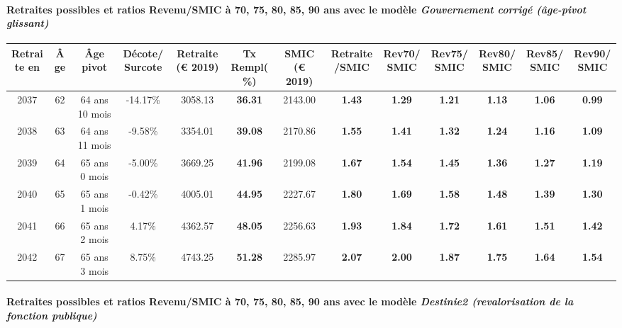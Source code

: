 \paragraph{Retraites possibles et ratios Revenu/SMIC à 70, 75, 80, 85, 90 ans avec le modèle \emph{Gouvernement corrigé (âge-pivot glissant)}}  
 
{ \scriptsize \begin{center} 
\begin{tabular}[htb]{|c|c||c|c||c|c||c||c|c|c|c|c|c|} 
\hline 
 Retraite en &  Âge &  Âge pivot &  Décote/Surcote &  Retraite (\euro{} 2019) &  Tx Rempl(\%) &  SMIC (\euro{} 2019) &  Retraite/SMIC &  Rev70/SMIC &  Rev75/SMIC &  Rev80/SMIC &  Rev85/SMIC &  Rev90/SMIC \\ 
\hline \hline 
 2037 &  62 &  64 ans 10 mois &  -14.17\% &  3058.13 &  {\bf 36.31} &  2143.00 &  {\bf 1.43} &  {\bf 1.29} &  {\bf 1.21} &  {\bf 1.13} &  {\bf 1.06} &  {\bf {\color{red} 0.99}} \\ 
\hline 
 2038 &  63 &  64 ans 11 mois &  -9.58\% &  3354.01 &  {\bf 39.08} &  2170.86 &  {\bf 1.55} &  {\bf 1.41} &  {\bf 1.32} &  {\bf 1.24} &  {\bf 1.16} &  {\bf 1.09} \\ 
\hline 
 2039 &  64 &  65 ans 0 mois &  -5.00\% &  3669.25 &  {\bf 41.96} &  2199.08 &  {\bf 1.67} &  {\bf 1.54} &  {\bf 1.45} &  {\bf 1.36} &  {\bf 1.27} &  {\bf 1.19} \\ 
\hline 
 2040 &  65 &  65 ans 1 mois &  -0.42\% &  4005.01 &  {\bf 44.95} &  2227.67 &  {\bf 1.80} &  {\bf 1.69} &  {\bf 1.58} &  {\bf 1.48} &  {\bf 1.39} &  {\bf 1.30} \\ 
\hline 
 2041 &  66 &  65 ans 2 mois &  4.17\% &  4362.57 &  {\bf 48.05} &  2256.63 &  {\bf 1.93} &  {\bf 1.84} &  {\bf 1.72} &  {\bf 1.61} &  {\bf 1.51} &  {\bf 1.42} \\ 
\hline 
 2042 &  67 &  65 ans 3 mois &  8.75\% &  4743.25 &  {\bf 51.28} &  2285.97 &  {\bf 2.07} &  {\bf 2.00} &  {\bf 1.87} &  {\bf 1.75} &  {\bf 1.64} &  {\bf 1.54} \\ 
\hline 
\hline 
\end{tabular} 
\end{center} } 
\paragraph{Retraites possibles et ratios Revenu/SMIC à 70, 75, 80, 85, 90 ans avec le modèle \emph{Destinie2 (revalorisation de la fonction publique)}}  
 
